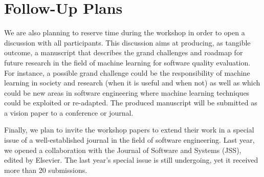 
\section{Follow-Up Plans}
We are also planning to reserve time during the workshop in order to open a discussion with all participants. This discussion aims at producing, as tangible outcome, a manuscript that describes the grand challenges and roadmap for future research in the field of machine learning for software quality evaluation. For instance, a possible grand challenge could be the responsibility of machine learning in society and research (\eg when it is useful and when not) as well as which could be new areas in software engineering where machine learning techniques could be exploited or re-adapted. The produced manuscript will be submitted as a vision paper to a conference or journal.

Finally, we plan to invite the workshop papers to extend their work in a special issue of a well-established journal in the field of software engineering. Last year, we opened a collaboration with the Journal of Software and Systems (JSS), edited by Elsevier. The last year's special issue is still undergoing, yet it received more than 20 submissions. 
